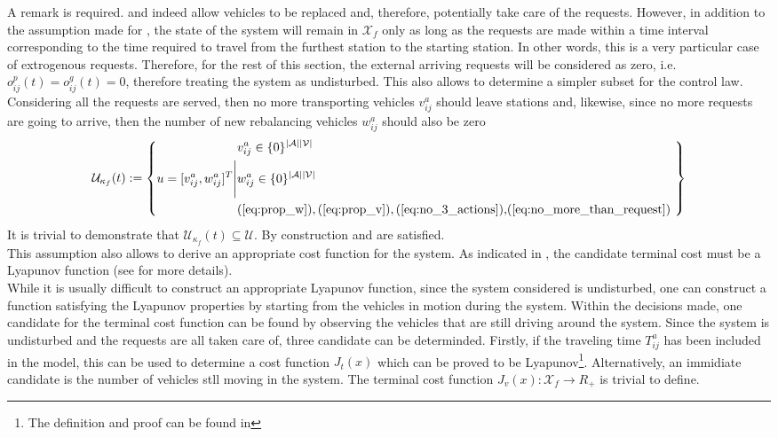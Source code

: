 A remark is required.  and  indeed allow vehicles to be replaced and, therefore, potentially take care of the requests. However, in addition to the assumption made for , the state of the system will remain in $\mathcal{X}_f$ only as long as the requests are made within a time interval corresponding to the time required to travel  from the furthest station to the starting station. In other words, this is a very particular case of extrogenous requests. Therefore, for the rest of this section, the external arriving requests will be considered as zero, i.e. $o^p_{ij}(t) =  o^g_{ij}(t) = 0$, therefore treating the system as undisturbed. This also allows to determine a simpler subset for the control law. Considering all the requests are served, then no more transporting vehicles $v^a_{ij}$ should leave stations and, likewise, since no more requests are going to arrive, then the number of new rebalancing vehicles $w^a_{ij}$ should also be zero
\begin{equation}
	\mathcal{\mathcal{U}}_{\kappa_f}(t) := \left\{
	\begin{aligned}
		&v^a_{ij} \in \{0\}^{|\mathcal{A}||\mathcal{V}|} \\
		u = [v^{a}_{ij}, w^{a}_{ij}]^T \Bigg|&w^a_{ij} \in \{0\}^{|\mathcal{A}||\mathcal{V}|}\\ 
		&\text{(\ref{eq:prop_w})},\text{(\ref{eq:prop_v})}, \text{(\ref{eq:no_3_actions}),(\ref{eq:no_more_than_request})
		} \\
	\end{aligned}
	\right\}
\end{equation}
It is trivial to demonstrate that $\mathcal{\mathcal{U}}_{\kappa_f}(t) \subseteq \mathcal{U}$. By construction  and  are satisfied. \\
This assumption also allows to derive an appropriate cost function for the system. As indicated in , the candidate terminal cost must be a Lyapunov function (see  for more details).  \\
While it is usually difficult to construct an appropriate Lyapunov function, since the system considered is undisturbed, one can construct a function satisfying the Lyapunov properties by starting from the vehicles in motion during the system. Within the decisions made, one candidate for the terminal cost function can be found by observing the vehicles that are still driving around the system. Since the system is undisturbed and the requests are all taken care of, three candidate can be determinded. Firstly, if the traveling time $T_{ij}^a$ has been included in the model, this can be used to determine a cost function $J_t(x)$ which can be proved to be Lyapunov\footnote{The definition and proof can be found in  }. Alternatively, an immidiate candidate is the number of vehicles stll moving in the system. The terminal cost function $J_v(x) : \mathcal{X}_f \rightarrow R_+$ is trivial to define. \\

